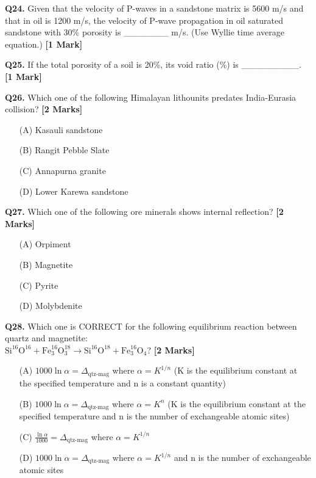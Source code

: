 \documentclass[11pt]{article}
\newcommand{\questiona}[2]{
    \noindent\textbf{Q#2.} #1 \hfill \textbf{[1 Mark]}
}
\newcommand{\questionb}[2]{
    \noindent\textbf{Q#2.} #1 \hfill \textbf{[2 Marks]}
}
\begin{document}
\questiona{Given that the velocity of P-waves in a sandstone matrix is 5600 m/s and that in oil is 1200 m/s, the velocity of P-wave propagation in oil saturated sandstone with 30\% porosity is \_\_\_\_\_\_\_ m/s. (Use Wyllie time average equation.)}{24}
\vspace{0.5cm}

\questiona{If the total porosity of a soil is 20\%, its void ratio (\%) is \_\_\_\_\_\_\_\_\_.}{25}
\vspace{0.5cm}

\questionb{Which one of the following Himalayan lithounits predates India-Eurasia collision?}{26}
\begin{enumerate}
    \item[(A)] Kasauli sandstone
    \item[(B)] Rangit Pebble Slate
    \item[(C)] Annapurna granite
    \item[(D)] Lower Karewa sandstone
\end{enumerate}
\vspace{0.5cm}

\questionb{Which one of the following ore minerals shows internal reflection?}{27}
\begin{enumerate}
    \item[(A)] Orpiment
    \item[(B)] Magnetite
    \item[(C)] Pyrite
    \item[(D)] Molybdenite
\end{enumerate}
\vspace{0.5cm}

\questionb{Which one is CORRECT for the following equilibrium reaction between quartz and magnetite: \\[0.2cm]
\(\text{Si}^{16}\text{O}^{16} + \text{Fe}_3^{16}\text{O}_3^{18} \rightarrow \text{Si}^{16}\text{O}^{18} + \text{Fe}_3^{16}\text{O}_4\)?}{28}
\begin{enumerate}
    \item[(A)] \(1000 \ln \alpha = \Delta_{\text{qtz-mag}}\) where \(\alpha = K^{1/n}\) (K is the equilibrium constant at the specified temperature and n is a constant quantity)
    \item[(B)] \(1000 \ln \alpha = \Delta_{\text{qtz-mag}}\) where \(\alpha = K^n\) (K is the equilibrium constant at the specified temperature and n is the number of exchangeable atomic sites)
    \item[(C)] \(\frac{\ln \alpha}{1000} = \Delta_{\text{qtz-mag}}\) where \(\alpha = K^{1/n}\)
    \item[(D)] \(1000 \ln \alpha = \Delta_{\text{qtz-mag}}\) where \(\alpha = K^{1/n}\) and n is the number of exchangeable atomic sites
\end{enumerate}
\vspace{0.5cm}
\end{document}
